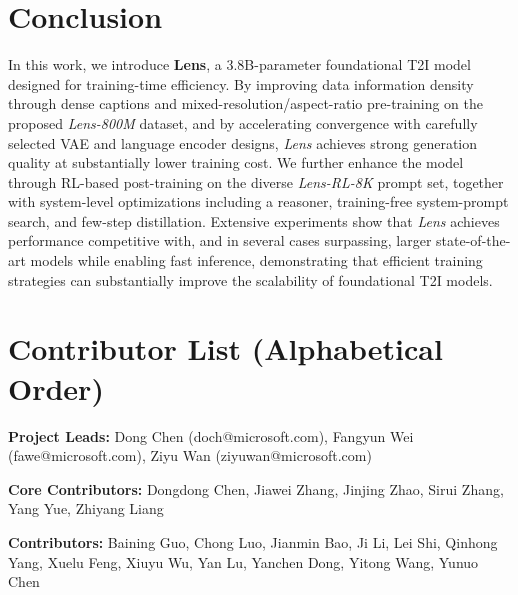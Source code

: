 \documentclass{llmxive}
\begin{document}
\section{Conclusion}

In this work, we introduce \textbf{Lens}, a 3.8B-parameter foundational T2I model designed for training-time efficiency. By improving data information density through dense captions and mixed-resolution/aspect-ratio pre-training on the proposed \textit{Lens-800M} dataset, and by accelerating convergence with carefully selected VAE and language encoder designs, \textit{Lens} achieves strong generation quality at substantially lower training cost. We further enhance the model through RL-based post-training on the diverse \textit{Lens-RL-8K} prompt set, together with system-level optimizations including a reasoner, training-free system-prompt search, and few-step distillation. Extensive experiments show that \textit{Lens} achieves performance competitive with, and in several cases surpassing, larger state-of-the-art models while enabling fast inference, demonstrating that efficient training strategies can substantially improve the scalability of foundational T2I models.


\section*{Contributor List (Alphabetical Order)}
\label{sec:contributor}

\noindent\textbf{Project Leads:} Dong Chen (doch@microsoft.com), Fangyun Wei (fawe@microsoft.com), Ziyu Wan (ziyuwan@microsoft.com)


\noindent\textbf{Core Contributors:} Dongdong Chen, Jiawei Zhang, Jinjing Zhao, Sirui Zhang, Yang Yue, Zhiyang Liang


\noindent\textbf{Contributors:} Baining Guo, Chong Luo, Jianmin Bao, Ji Li, Lei Shi, Qinhong Yang, Xuelu Feng, Xiuyu Wu, Yan Lu, Yanchen Dong, Yitong Wang, Yunuo Chen






\FloatBarrier  %





\appendix
\end{document}
